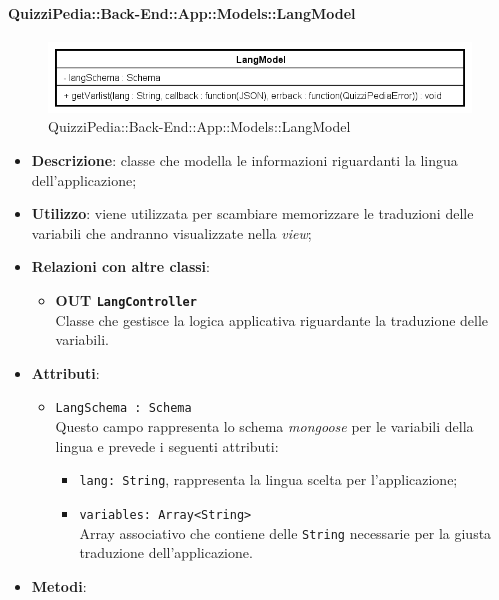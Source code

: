 \paragraph{QuizziPedia::Back-End::App::Models::LangModel}
\label{QuizziPedia::Back-End::App::Models::LangModel}
\begin{figure}[ht]
	\centering
	\includegraphics[scale=0.8]{UML/Classi/Back-End/QuizziPedia_Back-End_App_Models_langModel.png}
	\caption{QuizziPedia::Back-End::App::Models::LangModel}
\end{figure}
\FloatBarrier
	\begin{itemize}
		\item \textbf{Descrizione}: classe che modella le informazioni riguardanti la lingua dell'applicazione;
		\item \textbf{Utilizzo}: viene utilizzata per scambiare memorizzare le traduzioni delle variabili che andranno visualizzate nella \textit{view};
		\item \textbf{Relazioni con altre classi}:
			\begin{itemize}
				\item \textbf{OUT \texttt{LangController}} \\
				Classe che gestisce la logica applicativa riguardante la traduzione delle variabili.
			\end{itemize}
		\item \textbf{Attributi}:
			\begin{itemize}
				\item \texttt{LangSchema : Schema} \\
				Questo campo rappresenta lo schema \textit{mongoose} per le variabili della lingua e prevede i seguenti attributi:
					\begin{itemize}
						\item \texttt{lang: String}, rappresenta la lingua scelta per l'applicazione;
						\item \texttt{variables: Array<String>}\\ Array associativo che contiene delle \texttt{String} necessarie per la giusta traduzione dell'applicazione.
					\end{itemize}
			\end{itemize}
		\item \textbf{Metodi}:

\end{itemize}
